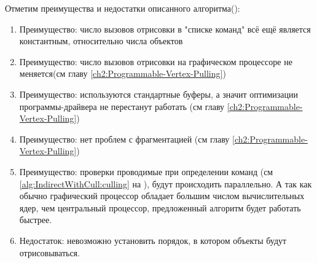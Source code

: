 Отметим преимущества и недостатки описанного алгоритма():
\begin{enumerate}[1.] 
	\item Преимущество: число вызовов отрисовки в "списке команд" всё ещё является константным, относительно числа объектов
	\item Преимущество: число вызовов отрисовки на графическом процессоре не меняется(см главу \ref{ch2:Programmable-Vertex-Pulling})
	\item Преимущество: используются стандартные буферы, а значит оптимизации программы-драйвера не перестанут работать (см главу \ref{ch2:Programmable-Vertex-Pulling})
	\item Преимущество: нет проблем с фрагментацией (см главу \ref{ch2:Programmable-Vertex-Pulling})
	\item Преимущество: проверки проводимые при определении  команд (см \ref{alg:IndirectWithCull:culling} на ), будут происходить параллельно. А так как обычно графический процессор обладает большим числом вычислительных ядер, чем центральный процессор, предложенный алгоритм будет работать быстрее.
	\item Недостаток: невозможно установить порядок, в котором объекты будут отрисовываться.
\end{enumerate}